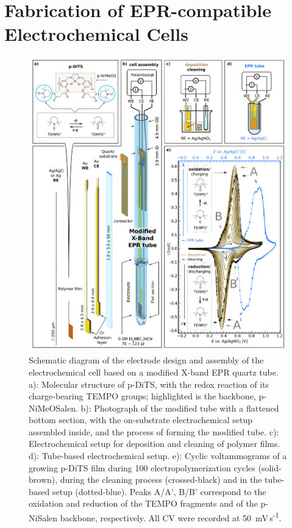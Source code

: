 \section{Fabrication of EPR-compatible Electrochemical Cells}
\begin{figure}[!ht]
 \centering
 \includegraphics[width=0.99\textwidth]{./operando_epr/figures/Flat_tube_setup.pdf}
 \caption{Schematic diagram of the electrode design and assembly of the electrochemical cell based on a modified X-band EPR quartz tube. a): Molecular structure of p-DiTS, with the redox reaction of its charge-bearing TEMPO groups; highlighted is the backbone, p-NiMeOSalen. b): Photograph of the modified tube with a flattened bottom section, with the on-substrate electrochemical setup assembled inside, and the process of forming the modified tube. c): Electrochemical setup for deposition and cleaning of polymer films. d): Tube-based electrochemical setup. e): Cyclic voltammograms of a growing p-DiTS film during 100 electropolymerization cycles (solid-brown), during the cleaning process (crossed-black) and in the tube-based setup (dotted-blue). Peaks A/A', B/B' correspond to the oxidation and reduction of the TEMPO fragments and of the p-NiSalen backbone, respectively. All CV were recorded at 50~mV\,s\textsuperscript{-1}.}
 \label{fig:flat_tube}
\end{figure}

